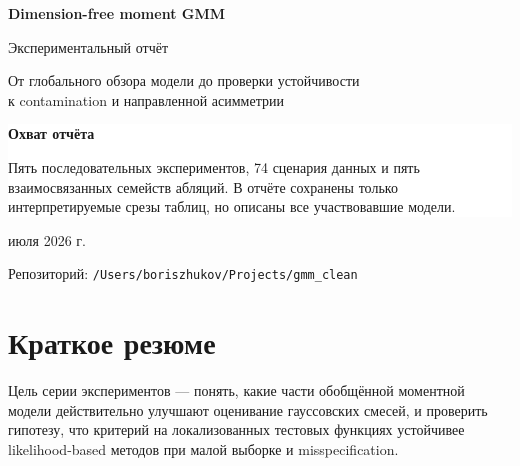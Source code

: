 \documentclass[11pt,a4paper]{article}
\newcommand{\code}[1]{{\footnotesize\nolinkurl{#1}}}
\begin{document}
\begin{titlepage}
  \pagecolor{navy}
  \color{white}
  \vspace*{24mm}
  {\sffamily\bfseries\fontsize{30}{35}\selectfont
    Dimension-free moment GMM\par}
  \vspace{7mm}
  {\sffamily\fontsize{19}{24}\selectfont
    Экспериментальный отчёт\par}
  \vspace{8mm}
  {\Large
    От глобального обзора модели до проверки устойчивости\\
    к contamination и направленной асимметрии\par}

  \vfill
  \colorbox{white}{%
    \parbox{0.86\textwidth}{%
      \color{navy}\vspace{3mm}
      \textbf{\sffamily Охват отчёта}\par
      Пять последовательных экспериментов, 74 сценария данных и пять
      взаимосвязанных семейств абляций. В отчёте сохранены только
      интерпретируемые срезы таблиц, но описаны все участвовавшие модели.
      \vspace{3mm}}}
  \vfill
  { июля 2026 г.\par}
  {\small Репозиторий: \code{/Users/boriszhukov/Projects/gmm_clean}\par}
\end{titlepage}
\nopagecolor

\tableofcontents
\clearpage

\section{Краткое резюме}

Цель серии экспериментов --- понять, какие части обобщённой моментной модели
действительно улучшают оценивание гауссовских смесей, и проверить гипотезу,
что критерий на локализованных тестовых функциях устойчивее likelihood-based
методов при малой выборке и misspecification.
\end{document}
